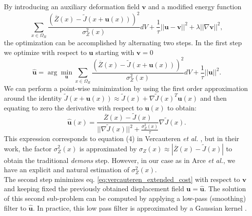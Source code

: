 By introducing an auxiliary deformation field $\mathbf{v}$ and a modified energy function
\begin{equation}\label{eq:vercauteren_extended_cost}
    \sum_{x \in \Omega_{R}} \frac{(\overline{Z}(x) - \tilde{J}(x + \mathbf{u}(x)))^{2}}{\sigma^{2}_{Z}(x)} dV + \frac{1}{\tau}||\mathbf{u}-\mathbf{v}||^{2}+\lambda ||\nabla \mathbf{v}||^{2},
\end{equation}
the optimization can be accomplished by alternating two steps. In the first step we optimize with respect to $\mathbf{u}$ starting with $\mathbf{v} = 0$
\begin{equation}\label{eq:vercauteren_step1}
    \widehat{\mathbf{u}} = \arg\min_{\mathbf{u}}\sum_{x \in \Omega_{R}} \frac{(\overline{Z}(x) - \tilde{J}(x+\mathbf{u}(x)))^{2}}{\sigma^{2}_{Z}(x)} dV + \frac{1}{\tau} ||\mathbf{u}||^{2}.
\end{equation}
We can perform a point-wise minimization by using the first order approximation around the identity
$\tilde{J}(x+\mathbf{u}(x)) \approx \tilde{J}(x) + \nabla \tilde{J}(x)^{T}\mathbf{u}(x)$ and then equating to zero the derivative with respect to $\mathbf{u}(x)$ to obtain:
\begin{equation}\label{eq:euler_lagrange_step1}
    \widehat{\mathbf{u}}(x) = \frac{\overline{Z}(x) - \tilde{J}(x)}{||\nabla \tilde{J}(x)||^{2} + \frac{\sigma_{Z}^{2}(x)}{\tau}}\nabla \tilde{J}(x).
\end{equation}
This expression corresponds to equation (4) in Vercauteren {\it et al.} \cite{Vercauteren2009}, but in their work, the factor $\sigma_{Z}^{2}(x)$
is approximated by $\sigma_{Z}(x) \approx |\overline{Z}(x) - \tilde{J}(x)|$ to obtain the traditional {\it demons} step. However, in our case as in Arce
{\it et al.}\cite{Arce-santana2014}, we have an explicit and natural estimation of $\sigma^{2}_{Z}(x)$.\\

The second step minimizes eq. \eqref{eq:vercauteren_extended_cost} with respect to $\mathbf{v}$ and keeping fixed the previously obtained displacement field $\mathbf{u}=\widehat{\mathbf{u}}$. The solution of this second sub-problem can be computed by applying a low-pass (smoothing) filter to $\widehat{\mathbf{u}}$. In practice,
this low pass filter is approximated by a Gaussian kernel \cite{Vercauteren2009}\cite{Avants2011}.


